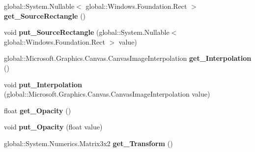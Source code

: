 \begin{DoxyCompactItemize}
global\+::\+System.\+Nullable$<$ global\+::\+Windows.\+Foundation.\+Rect $>$ {\bfseries get\+\_\+\+Source\+Rectangle} ()
\item 
\mbox{\label{class_microsoft_1_1_graphics_1_1_canvas_1_1_brushes_1_1_canvas_image_brush_a06ce9ecc2a14f31cc237bf4f1d636c3b}} 
void {\bfseries put\+\_\+\+Source\+Rectangle} (global\+::\+System.\+Nullable$<$ global\+::\+Windows.\+Foundation.\+Rect $>$ value)
\item 
\mbox{\label{class_microsoft_1_1_graphics_1_1_canvas_1_1_brushes_1_1_canvas_image_brush_aa876d16918c915a266a3e9223dc1d6d3}} 
global\+::\+Microsoft.\+Graphics.\+Canvas.\+Canvas\+Image\+Interpolation {\bfseries get\+\_\+\+Interpolation} ()
\item 
\mbox{\label{class_microsoft_1_1_graphics_1_1_canvas_1_1_brushes_1_1_canvas_image_brush_a733530cfb4590949e1eddf304a9e861f}} 
void {\bfseries put\+\_\+\+Interpolation} (global\+::\+Microsoft.\+Graphics.\+Canvas.\+Canvas\+Image\+Interpolation value)
\item 
\mbox{\label{class_microsoft_1_1_graphics_1_1_canvas_1_1_brushes_1_1_canvas_image_brush_afaed5d2ea1294c742aa83915f761c1de}} 
float {\bfseries get\+\_\+\+Opacity} ()
\item 
\mbox{\label{class_microsoft_1_1_graphics_1_1_canvas_1_1_brushes_1_1_canvas_image_brush_a027949e4f2b38847ed4732614740696b}} 
void {\bfseries put\+\_\+\+Opacity} (float value)
\item 
\mbox{\label{class_microsoft_1_1_graphics_1_1_canvas_1_1_brushes_1_1_canvas_image_brush_aecf3140564df93caed075a2657fac1ee}} 
global\+::\+System.\+Numerics.\+Matrix3x2 {\bfseries get\+\_\+\+Transform} ()
\item 
\mbox{\label{class_microsoft_1_1_graphics_1_1_canvas_1_1_brushes_1_1_canvas_image_brush_aacd3a10615ba452348d129139e6f0c68}} 

\end{DoxyCompactItemize}
